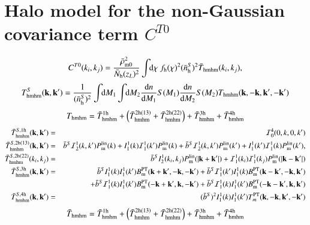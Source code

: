 \documentclass[onecolumn,notitlepage,showpacs,amsmath,amssymb,prd,floatfix]{revtex4-1}
\newcommand{\bk}{{\bf k}}
\newcommand{\dr}{\mathrm{d}}
\newcommand{\bthmhm}{\bar{T}_{\rm hmhm}}
\newcommand{\bnhs}{\bar{n}_{\rm h}^S}
\newcommand{\pml}{P^{\rm lin}_{\rm m}}
\newcommand{\bNh}{\bar{N}_{\rm h}}
\begin{document}
\section{Halo model for the non-Gaussian covariance term $C^{T0}$}

\begin{equation}
 C^{T0}(k_i,k_j)=\frac{\bar{\rho}_{\rm m0}^2}{\bNh(z_L)^2}
  \int\!\!\dr\chi~f_{\rm h}(\chi)^2(\bnhs)^2\bar{T}_{\rm hmhm}(k_i,k_j),
\end{equation}
%
\begin{equation}
 T^S_{\rm hmhm}(\bk,\bk')=\frac{1}{(\bnhs)^2}
  \int\!\!\dr M_1\int\!\!\dr M_2 \frac{\dr n}{\dr M_1}S(M_1)
  \frac{\dr n}{\dr M_2}S(M_2)T_{\rm hmhm}(\bk,-\bk,\bk',-\bk')
\end{equation}
%
\begin{equation}
 T_{\rm hmhm}=\bar{T}_{\rm hmhm}^{\rm 1h}
  +\left(\bar{T}_{\rm hmhm}^{\rm 2h(13)}
    +\bar{T}_{\rm hmhm}^{\rm 2h(22)}
	  \right)
   +\bar{T}_{\rm hmhm}^{\rm 3h}
   +\bar{T}_{\rm hmhm}^{\rm 4h}
\end{equation}
%
\begin{eqnarray}
 \bthmhm^{S, {\rm 1h}}(\bk,\bk')&=&{\cal I}^{4}_0(0,k,0,k')\nonumber\\
 \bthmhm^{S, {\rm 2h(13)}}(\bk,\bk')&=&\bar{b}^S{\cal
 I}^1_{2}(k,k')\pml(k)
 +I^1_1(k){\cal I}^1_1(k')\pml(k)
 +\bar{b}^S{\cal I}^1_2(k,k')\pml(k')
 +I^1_1(k'){\cal I}^1_1(k)\pml(k'),\nonumber\\
 \bthmhm^{S, {\rm 2h(22)}}(k_i,k_j)&=&\bar{b}^SI^1_2(k_i,k_j)\pml(|\bk+\bk'|)
 +{\cal I}^1_1(k_i){\cal I}^1_1(k_j)\pml(|\bk-\bk'|)\nonumber\\
 \bthmhm^{S, {\rm 3h}}(\bk,\bk')&=&
 \bar{b}^SI^1_1(k)I^1_1(k')B^{\rm PT}_{\rm m}(\bk+\bk',-\bk,-\bk')
 +\bar{b}^S{\cal I}^1_1(k')I^1_1(k)B^{\rm PT}_{\rm m}(\bk-\bk',-\bk,\bk')\nonumber\\
&& +\bar{b}^S{\cal I}^1_1(k)I^1_1(k')B^{\rm PT}_{\rm m}(-\bk+\bk',\bk,-\bk')
 +\bar{b}^S{\cal I}^1_1(k)I^1_1(k')B^{\rm PT}_{\rm
 m}(-\bk-\bk',\bk,\bk')\nonumber\\
 \bthmhm^{S, {\rm 4h}}(\bk,\bk')&=&(\bar{b}^S)^2I^1_1(k)I^1_1(k')T^{\rm PT}_m(\bk,-\bk,\bk',-\bk')
\end{eqnarray}
\begin{equation}
 \bar{T}_{\rm hmhm}=\bar{T}_{\rm hmhm}^{\rm 1h}
  +\left(\bar{T}_{\rm hmhm}^{\rm 2h(13)}
    +\bar{T}_{\rm hmhm}^{\rm 2h(22)}
	  \right)
   +\bar{T}_{\rm hmhm}^{\rm 3h}
   +\bar{T}_{\rm hmhm}^{\rm 4h}
\end{equation}
\end{document}

